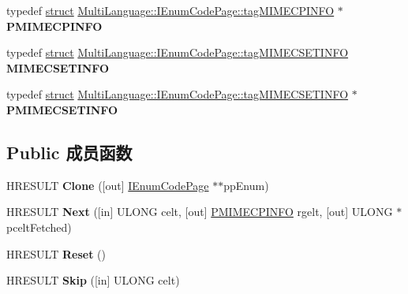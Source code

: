\begin{DoxyCompactItemize}
\item 
\mbox{\label{interface_multi_language_1_1_i_enum_code_page_a7d75e1bda8fbbc1c786c4e838f63c2d0}} 
typedef \hyperlink{interfacestruct}{struct} \hyperlink{struct_multi_language_1_1_i_enum_code_page_1_1tag_m_i_m_e_c_p_i_n_f_o}{Multi\+Language\+::\+I\+Enum\+Code\+Page\+::tag\+M\+I\+M\+E\+C\+P\+I\+N\+FO} $\ast$ {\bfseries P\+M\+I\+M\+E\+C\+P\+I\+N\+FO}
\item 
\mbox{\label{interface_multi_language_1_1_i_enum_code_page_aa58ccbfb42713088fd89ca4122cc512a}} 
typedef \hyperlink{interfacestruct}{struct} \hyperlink{struct_multi_language_1_1_i_enum_code_page_1_1tag_m_i_m_e_c_s_e_t_i_n_f_o}{Multi\+Language\+::\+I\+Enum\+Code\+Page\+::tag\+M\+I\+M\+E\+C\+S\+E\+T\+I\+N\+FO} {\bfseries M\+I\+M\+E\+C\+S\+E\+T\+I\+N\+FO}
\item 
\mbox{\label{interface_multi_language_1_1_i_enum_code_page_ae8be37ffb18bdbdcf79bf768420a4227}} 
typedef \hyperlink{interfacestruct}{struct} \hyperlink{struct_multi_language_1_1_i_enum_code_page_1_1tag_m_i_m_e_c_s_e_t_i_n_f_o}{Multi\+Language\+::\+I\+Enum\+Code\+Page\+::tag\+M\+I\+M\+E\+C\+S\+E\+T\+I\+N\+FO} $\ast$ {\bfseries P\+M\+I\+M\+E\+C\+S\+E\+T\+I\+N\+FO}
\end{DoxyCompactItemize}
\subsection*{Public 成员函数}
\begin{DoxyCompactItemize}
\item 
\mbox{\label{interface_multi_language_1_1_i_enum_code_page_aef9be54b49ac72727c809eeb4be523e9}} 
H\+R\+E\+S\+U\+LT {\bfseries Clone} (\mbox{[}out\mbox{]} \hyperlink{interface_multi_language_1_1_i_enum_code_page}{I\+Enum\+Code\+Page} $\ast$$\ast$pp\+Enum)
\item 
\mbox{\label{interface_multi_language_1_1_i_enum_code_page_aa27cfe742adc32879f0be70a5a57d200}} 
H\+R\+E\+S\+U\+LT {\bfseries Next} (\mbox{[}in\mbox{]} U\+L\+O\+NG celt, \mbox{[}out\mbox{]} \hyperlink{struct_multi_language_1_1_i_enum_code_page_1_1tag_m_i_m_e_c_p_i_n_f_o}{P\+M\+I\+M\+E\+C\+P\+I\+N\+FO} rgelt, \mbox{[}out\mbox{]} U\+L\+O\+NG $\ast$pcelt\+Fetched)
\item 
\mbox{\label{interface_multi_language_1_1_i_enum_code_page_a67c43539b46abadefbd700d03802a12c}} 
H\+R\+E\+S\+U\+LT {\bfseries Reset} ()
\item 
\mbox{\label{interface_multi_language_1_1_i_enum_code_page_a05c0548189e771a62c6e069812f07f3f}} 
H\+R\+E\+S\+U\+LT {\bfseries Skip} (\mbox{[}in\mbox{]} U\+L\+O\+NG celt)
\end{DoxyCompactItemize}
